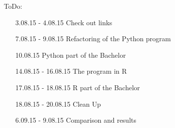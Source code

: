 \documentclass{article}
\begin{document}
ToDo:
\begin{enumerate}
    \item[3.08.15 - 4.08.15] Check out links
    \item[7.08.15 - 9.08.15] Refactoring of the Python program
    \item[10.08.15] Python part of the Bachelor
    \item[14.08.15 - 16.08.15] The program in R
    \item[17.08.15 - 18.08.15] R part of the Bachelor
    \item[18.08.15 - 20.08.15] Clean Up
    \item[6.09.15 - 9.08.15] Comparison and results
\end{enumerate}
\end{document}
